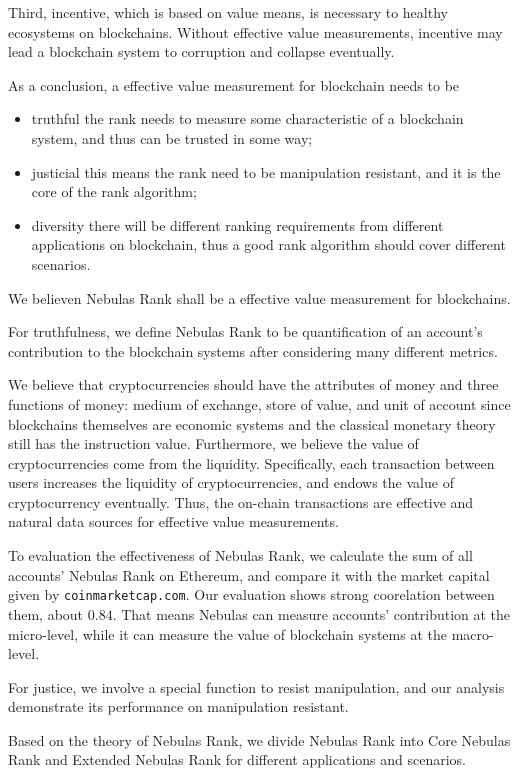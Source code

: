 Third, incentive, which is based on value means, is necessary to healthy
ecosystems on blockchains. Without effective value measurements, incentive may
lead a blockchain system to corruption and collapse eventually.

As a conclusion, a effective value measurement for blockchain needs to be
\begin{itemize}
\item{truthful} the rank needs to measure some characteristic of a
blockchain system, and thus can be trusted in some way;
\item{justicial} this means the rank need to be manipulation resistant, and
it is the core of the rank algorithm;
\item{diversity} there will be different ranking requirements from different
applications on blockchain, thus a good rank algorithm should cover different
scenarios.
\end{itemize}

We believen Nebulas Rank shall be a effective value measurement for
blockchains.

For truthfulness, we define Nebulas Rank to be quantification of an account's
contribution to the blockchain systems after considering many different
metrics.

We believe that cryptocurrencies should have the attributes of money and
three functions of money: medium of exchange, store of value, and unit of
account since blockchains themselves are economic systems and the classical
monetary theory still has the instruction value.
Furthermore, we believe the value of cryptocurrencies come from the
liquidity. Specifically, each transaction between users increases the
liquidity of cryptocurrencies, and endows the value of
cryptocurrency eventually. Thus, the on-chain transactions are effective and
natural data sources for effective value measurements.

To evaluation the effectiveness of Nebulas Rank, we calculate the sum of all
accounts' Nebulas Rank on Ethereum, and compare it with the market capital
given by \texttt{coinmarketcap.com}. Our evaluation shows strong
coorelation between them, about $0.84$. That means Nebulas can measure
accounts' contribution at the micro-level, while it can measure the
value of blockchain systems at the macro-level.

For justice, we involve a special function to resist manipulation,
and our analysis demonstrate its performance on manipulation
resistant.

Based on the theory of Nebulas Rank, we divide Nebulas Rank into Core Nebulas
Rank and Extended Nebulas Rank for different applications and scenarios.

